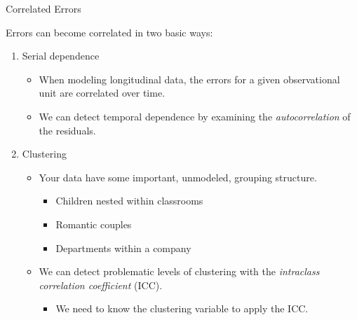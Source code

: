 \documentclass{beamer}\usepackage[]{graphicx}\usepackage[]{color}
\begin{document}
\begin{frame}{Correlated Errors}
  
  Errors can become correlated in two basic ways:
  \vb
  \begin{enumerate}
  \item Serial dependence
    \begin{itemize}
    \item When modeling longitudinal data, the errors for a given observational 
      unit are correlated over time.
      \vc
    \item We can detect temporal dependence by examining the 
      \emph{autocorrelation} of the residuals.
    \end{itemize}
    \vb
  \item Clustering
    \begin{itemize}
    \item Your data have some important, unmodeled, grouping structure.
      \begin{itemize}
      \item Children nested within classrooms
      \item Romantic couples
      \item Departments within a company
      \end{itemize}
      \vc
    \item We can detect problematic levels of clustering with the 
      \emph{intraclass correlation coefficient} (ICC).
      \begin{itemize}
      \item We need to know the clustering variable to apply the ICC.
      \end{itemize}
    \end{itemize}
  \end{enumerate}
  
\end{frame}

\end{document}

